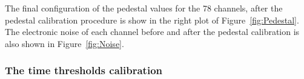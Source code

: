 \bigbreak

The final configuration of the pedestal values for the 78 channels, after the pedestal calibration procedure is show in the right plot of Figure~\ref{fig:Pedestal}. The electronic noise of each channel before and after the pedestal calibration is also shown in Figure~\ref{fig:Noise}.


\subsubsection{The time thresholds calibration}
\label{subsubsec:The time thresholds calibration}

